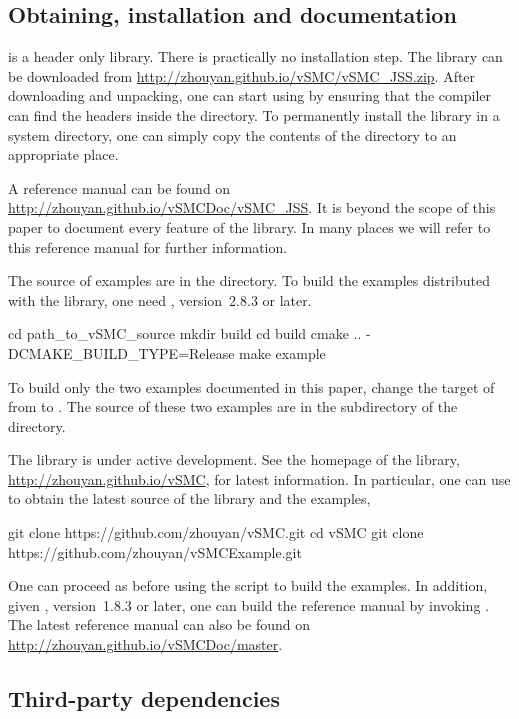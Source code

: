 \documentclass[11pt, fontset=Minion, showoverfull,
bib, mintcode, minted=cache]{marticle}
\begin{document}
\subsection{Obtaining, installation and documentation}

\vsmc is a header only library. There is practically no installation step. The
library can be downloaded from
\url{http://zhouyan.github.io/vSMC/vSMC_JSS.zip}. After downloading and
unpacking, one can start using \vsmc by ensuring that the compiler can find
the headers inside the  directory. To permanently install
the library in a system directory, one can simply copy the contents of the
 directory to an appropriate place.

A reference manual can be found on
\url{http://zhouyan.github.io/vSMCDoc/vSMC_JSS}. It is beyond the scope of
this paper to document every feature of the library. In many places we will
refer to this reference manual for further information.

The source of examples are in the  directory. To build
the examples distributed with the library, one need \fcmake, version~2.8.3 or
later.
\begin{shcode}
cd path_to_vSMC_source
mkdir build
cd build
cmake .. -DCMAKE_BUILD_TYPE=Release
make example
\end{shcode}
To build only the two examples documented in this paper, change the target of
 from  to . The source of
these two examples are in the  subdirectory of the
 directory.

The library is under active development. See the homepage of the library,
\url{http://zhouyan.github.io/vSMC}, for latest information. In particular,
one can use \lgit to obtain the latest source of the library and the examples,
\begin{shcode}
git clone https://github.com/zhouyan/vSMC.git
cd vSMC
git clone https://github.com/zhouyan/vSMCExample.git
\end{shcode}
One can proceed as before using the \lcmake script to build the examples. In
addition, given \fdoxygen, version~1.8.3 or later, one can build the reference
manual by invoking . The latest reference manual can also
be found on \url{http://zhouyan.github.io/vSMCDoc/master}.

\subsection{Third-party dependencies}
\end{document}
